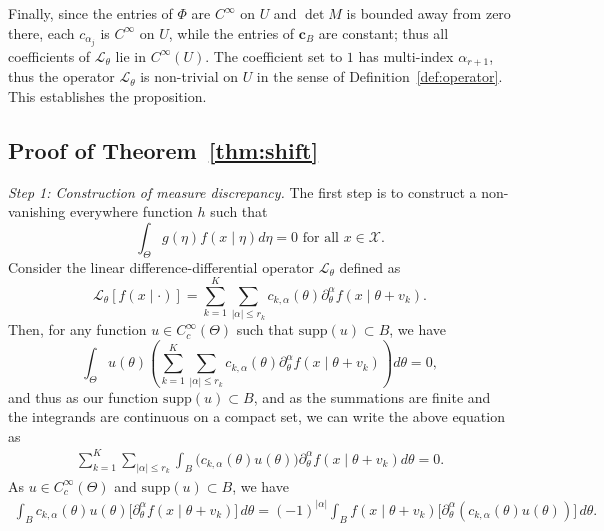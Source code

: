 \documentclass[11pt,twoside]{article} %
\begin{document}
Finally, since the entries of $\Phi$ are $C^\infty$ on $U$ and $\det M$ is bounded away from zero there, each
$c_{\alpha_j}$ is $C^\infty$ on $U$, while the entries of $\mathbf c_B$ are constant; thus all coefficients of
$\mathcal L_\theta$ lie in $C^\infty(U)$. The coefficient set to $1$ has multi-index $\alpha_{r+1}$,
thus the operator $\mathcal L_\theta$ is non-trivial on $U$ in the sense of
Definition~\ref{def:operator}. This establishes the proposition.\subsection{Proof of Theorem~\ref{thm:shift}}
\label{app:proof:thm_shift}
\textit{Step 1: Construction of measure discrepancy.} 
The first step is to construct a non-vanishing everywhere function $h$ such that 
\begin{equation*}
    \int_{\Theta} g(\eta)f(x\mid\eta)d\eta =0 \text{ for all } x \in \mathcal{X}. 
\end{equation*}
Consider the linear difference-differential operator $\mathcal{L}_{\theta}$ defined as 
\begin{equation*}
    \mathcal{L}_{\theta}[f(x\mid\cdot)] = \sum_{k=1}^{K}\sum_{|\alpha| \leq r_k} c_{k,\alpha}(\theta)\partial^{\alpha}_{\theta}f(x\mid\theta+v_k). 
\end{equation*}
Then, for any function $u \in C^{\infty}_{c}(\Theta)$ such that $\text{supp}(u) \subset B$, we have 
\begin{equation*}
    \int_{\Theta} u(\theta) \left(\sum_{k=1}^K \sum_{|\alpha|\leq r_k} c_{k,\alpha}(\theta)\partial^{\alpha}_{\theta}f(x\mid\theta+v_k)\right)d\theta = 0,
\end{equation*}
and thus as our function $\text{supp}(u) \subset B$, and as the summations are finite and the integrands are continuous on a compact set, we can write the above equation as 
\begin{align}
\sum_{k=1}^K \sum_{|\alpha| \le r_k} \int_B \Big( c_{k, \alpha}(\theta) u(\theta) \Big) \partial_\theta^\alpha f(x\mid\theta + v_k) d\theta = 0. \label{eq:dung_shift_PDE_2}
\end{align}
As $u \in C^{\infty}_c(\Theta)$ and $\mathrm{supp}(u) \subset B$, we have 
\begin{align*}
\int_B c_{k,\alpha}(\theta)u(\theta) \big[ \partial_\theta^\alpha f(x \mid \theta + v_k) \big] \, d\theta = (-1)^{|\alpha|} \int_B f(x\mid \theta + v_k) \big[ \partial_\theta^\alpha ( c_{k,\alpha}(\theta)u(\theta)) \big] \, d\theta.
\end{align*}
\end{document}
